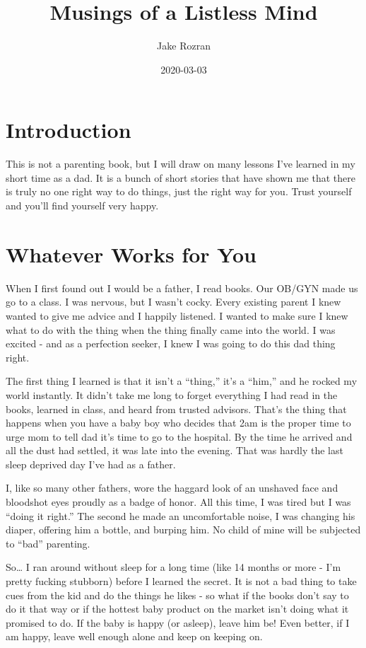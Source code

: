 \documentclass[]{book}
\title{Musings of a Listless Mind}
\author{Jake Rozran}
\date{2020-03-03}
\begin{document}
\maketitle

{
\setcounter{tocdepth}{1}
\tableofcontents
}
\hypertarget{introduction}{%
\chapter{Introduction}\label{introduction}}

This is not a parenting book, but I will draw on many lessons I've learned in my
short time as a dad. It is a bunch of short stories that have shown me that
there is truly no one right way to do things, just the right way for you. Trust
yourself and you'll find yourself very happy.

\hypertarget{WWFY}{%
\chapter{Whatever Works for You}\label{WWFY}}

When I first found out I would be a father, I read books. Our OB/GYN made us go
to a class. I was nervous, but I wasn't cocky. Every existing parent I knew
wanted to give me advice and I happily listened. I wanted to make sure I knew
what to do with the thing when the thing finally came into the world. I was
excited - and as a perfection seeker, I knew I was going to do this dad thing
right.

The first thing I learned is that it isn't a ``thing,'' it's a ``him,'' and he
rocked my world instantly. It didn't take me long to forget everything I had
read in the books, learned in class, and heard from trusted advisors. That's the
thing that happens when you have a baby boy who decides that 2am is the proper
time to urge mom to tell dad it's time to go to the hospital. By the time he
arrived and all the dust had settled, it was late into the evening. That was
hardly the last sleep deprived day I've had as a father.

I, like so many other fathers, wore the haggard look of an unshaved face and
bloodshot eyes proudly as a badge of honor. All this time, I was tired but I was
``doing it right.'' The second he made an uncomfortable noise, I was changing his
diaper, offering him a bottle, and burping him. No child of mine will be
subjected to ``bad'' parenting.

So\ldots{} I ran around without sleep for a long time (like 14 months or more - I'm
pretty fucking stubborn) before I learned the secret. It is not a bad thing to
take cues from the kid and do the things he likes - so what if the books don't
say to do it that way or if the hottest baby product on the market isn't doing
what it promised to do. If the baby is happy (or asleep), leave him be! Even
better, if I am happy, leave well enough alone and keep on keeping on.
\end{document}
